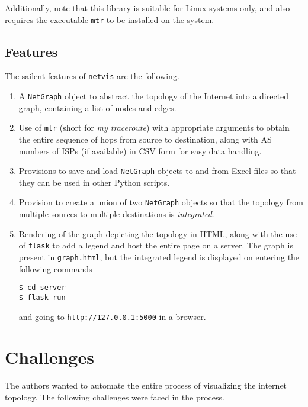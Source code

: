 \documentclass[journal,12pt,twocolumn]{IEEEtran}
\begin{document}
Additionally, note that this library is suitable for Linux systems only, and
also requires the executable
\href{https://linux.die.net/man/8/mtr}{\texttt{mtr}} to be installed on the
system.

\subsection{Features}

The sailent features of \texttt{netvis} are the following.
\begin{enumerate}
     \item A \texttt{NetGraph} object to abstract the topology of the Internet
     into a directed graph, containing a list of nodes and edges.
     \item Use of \texttt{mtr} (short for \emph{my traceroute}) with appropriate
     arguments to obtain the entire sequence of hops from source to destination,
     along with AS numbers of ISPs (if available) in CSV form for easy data
     handling.
     \item Provisions to save and load \texttt{NetGraph} objects to and from
     Excel files so that they can be used in other Python scripts.
     \item Provision to create a union of two \texttt{NetGraph} objects so that
     the topology from multiple sources to multiple destinations is
     \emph{integrated}.
     \item Rendering of the graph depicting the topology in HTML, along with the
     use of \texttt{flask} to add a legend and host the entire page on a server.
     The graph is present in \texttt{graph.html}, but the integrated legend is
     displayed on entering the following commands
     \begin{lstlisting}
$ cd server
$ flask run
     \end{lstlisting}
     and going to \texttt{http://127.0.0.1:5000} in a browser.
\end{enumerate}

\section{Challenges}

The authors wanted to automate the entire process of visualizing the internet
topology. The following challenges were faced in the process.
\end{document}

